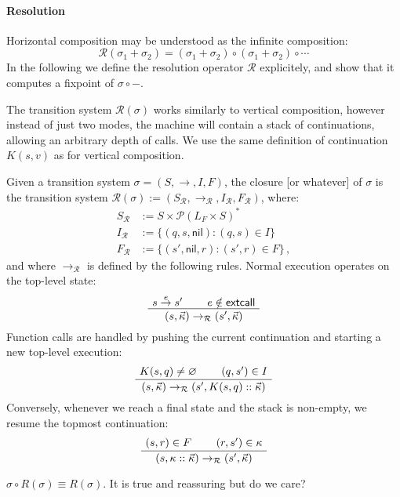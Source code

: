 \documentclass[sigplan,10pt,review,anonymous]{acmart}
\newcommand{\kw}[1]{\ensuremath{ \textsf{#1} }}
\begin{document}

\paragraph{Resolution} %

Horizontal composition may be understood as the infinite composition:
\[
  \mathcal{R}(\sigma_1 + \sigma_2) =
    (\sigma_1 + \sigma_2) \circ (\sigma_1 + \sigma_2) \circ \cdots
\]
In the following
we define the resolution operator $\mathcal{R}$ explicitely,
and show that it computes a fixpoint of $\sigma \circ -$.

The transition system $\mathcal{R}(\sigma)$
works similarly to vertical composition,
however instead of just two modes,
the machine will contain a stack of continuations,
allowing an arbitrary depth of calls.
We use the same definition of continuation $K(s, v)$
as for vertical composition.

\begin{definition}
Given a transition system $\sigma = (S, \rightarrow, I, F)$,
the closure [or whatever] of $\sigma$ is the transition system
$\mathcal{R}(\sigma) :=
  (S_\mathcal{R}, \rightarrow_\mathcal{R}, I_\mathcal{R}, F_\mathcal{R})$,
where:
\begin{align*}
  S_\mathcal{R} &:= S \times \mathcal{P}(L_F \times S)^* \\
  I_\mathcal{R} &:= \{ (q, s, \kw{nil}) : (q, s) \in I \} \\
  F_\mathcal{R} &:= \{ (s', \kw{nil}, r) : (s', r) \in F \} \,,
\end{align*}
and where $\rightarrow_\mathcal{R}$ is defined
by the following rules.
Normal execution operates on the top-level state:
\[
  \AxiomC{$s \stackrel{e}{\rightarrow} s'$}
  \AxiomC{$e \notin \kw{extcall}$}
  \BinaryInfC{$(s, \vec{\kappa}) \rightarrow_\mathcal{R} (s', \vec{\kappa})$}
  \DisplayProof
\]
Function calls are handled by pushing the current continuation
and starting a new top-level execution:
\[
  \AxiomC{$K(s, q) \ne \varnothing$}
  \AxiomC{$(q, s') \in I$}
  \BinaryInfC{$(s, \vec{\kappa}) \rightarrow_\mathcal{R} (s', K(s, q) :: \vec{\kappa})$}
  \DisplayProof
\]
Conversely,
whenever we reach a final state
and the stack is non-empty,
we resume the topmost continuation:
\[
  \AxiomC{$(s, r) \in F$}
  \AxiomC{$(r, s') \in \kappa$}
  \BinaryInfC{$(s, \kappa :: \vec{\kappa}) \rightarrow_\mathcal{R} (s', \vec{\kappa})$}
  \DisplayProof
\]
\end{definition}

\begin{theorem}
$\sigma \circ R(\sigma) \equiv R(\sigma)$.
It is true and reassuring but do we care?
\end{theorem}
\end{document}
